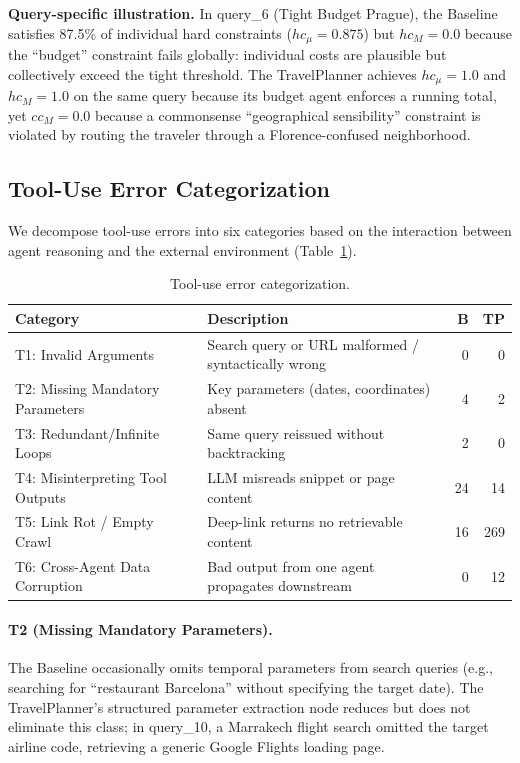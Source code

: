 \documentclass[a4paper,oneside,bibliography=totoc]{scrbook}
\begin{document}
\textbf{Query-specific illustration.} In query\_6 (Tight Budget Prague), the Baseline satisfies 87.5\% of individual hard constraints ($hc_\mu=0.875$) but $hc_M=0.0$ because the ``budget'' constraint fails globally: individual costs are plausible but collectively exceed the tight threshold. The TravelPlanner achieves $hc_\mu=1.0$ and $hc_M=1.0$ on the same query because its budget agent enforces a running total, yet $cc_M=0.0$ because a commonsense ``geographical sensibility'' constraint is violated by routing the traveler through a Florence-confused neighborhood.

\subsection{Tool-Use Error Categorization}
\label{subsec:tool-use}

We decompose tool-use errors into six categories based on the interaction between agent reasoning and the external environment (Table~\ref{tab:tool-use}).

\begin{table}[htbp]
\centering
\caption{Tool-use error categorization.}
\label{tab:tool-use}
\begin{tabular}{@{}llrr@{}}
\toprule
\textbf{Category} & \textbf{Description} & \textbf{B} & \textbf{TP} \\
\midrule
T1: Invalid Arguments & Search query or URL malformed / syntactically wrong & 0 & 0 \\
T2: Missing Mandatory Parameters & Key parameters (dates, coordinates) absent & 4 & 2 \\
T3: Redundant/Infinite Loops & Same query reissued without backtracking & 2 & 0 \\
T4: Misinterpreting Tool Outputs & LLM misreads snippet or page content & 24 & 14 \\
T5: Link Rot / Empty Crawl & Deep-link returns no retrievable content & 16 & 269 \\
T6: Cross-Agent Data Corruption & Bad output from one agent propagates downstream & 0 & 12 \\
\bottomrule
\end{tabular}
\end{table}

\paragraph{T2 (Missing Mandatory Parameters).} The Baseline occasionally omits temporal parameters from search queries (e.g., searching for ``restaurant Barcelona'' without specifying the target date). The TravelPlanner's structured parameter extraction node reduces but does not eliminate this class; in query\_10, a Marrakech flight search omitted the target airline code, retrieving a generic Google Flights loading page.
\end{document}
